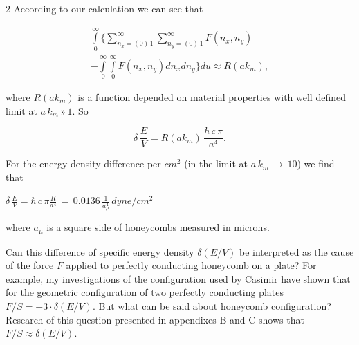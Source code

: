 \documentclass[twoside, 10pt]{article}
\def\myvspacebeforesubsection{-2.0mm}
\def\myvspaceaftersubsection{-2.5mm}
\begin{document}
\begin{multicols}{2}
    According to our calculation we can see that

\vspace{-3.5mm}
\begin{equation}
\begin{array}{l}
    \int\limits_{0}^{\infty} \Bigg\{ \sum\limits_{n_x=\left(0\right)\,1}^{\infty} \sum\limits_{n_y=\left(0\right)\,1}^{\infty} F\left(n_x, n_y\right) \\
- \int\limits_{0}^{\infty} \int\limits_{0}^{\infty} F\left(n_x, n_y\right) d{n_x} d{n_y} \Bigg\} d{u} \approx R\left(a k_m\right),
\end{array}
\end{equation}


    where \(R\left(a k_m\right)\) is a function depended on material
properties with well defined limit at \(a\,k_m\,»\,1\). So

    \begin{equation}
\delta\,\frac{E}{V} = R\left(a k_m\right)\,\frac{\hbar\,c\,\pi}{a^4}.
\end{equation}

    For the energy density difference per \(cm^2\) (in the limit at
\(a\,k_m\,\rightarrow \,10\)) we find that

    \(\delta\,\frac{E}{V} = \hbar\,c\, \pi\frac{R}{a^4}\,=\,0.0136\,\frac{1}{a_{\mu}^4}\,dyne/cm^2\)

    where \(a_{\mu}\) is a square side of honeycombs measured in microns.


    Can this difference of specific energy density
\(\delta\left(E/V\right)\) be interpreted as the cause of the force
\(F\) applied to perfectly conducting honeycomb on a plate? For example,
my investigations of the configuration used by Casimir have shown that for the
geometric configuration of two perfectly conducting plates
\(F/S = -3 \cdot \delta\left(E/V\right)\). But what can be said about honeycomb
configuration? Research of this question presented in appendixes B and C
shows that \(F/S \approx \delta\left(E/V\right)\).


\vspace{\myvspacebeforesubsection}
    \subsection*{} \label{conclusions}
\vspace{\myvspaceaftersubsection}


\end{multicols}
\end{document}
